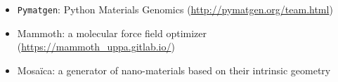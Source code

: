 \documentclass[10pt,a4paper,ragged2e,academicons]{altacv}
\begin{document}
\vspace{-1mm}
\begin{itemize}
\item \texttt{Pymatgen}: Python Materials Genomics {(\footnotesize\url{http://pymatgen.org/team.html})}
\item Mammoth: a molecular force field optimizer \hbox{(\footnotesize\url{https://mammoth_uppa.gitlab.io/})}
\item Mosaïca: a generator of nano-materials based on their intrinsic geometry
\end{itemize}






\end{document}
